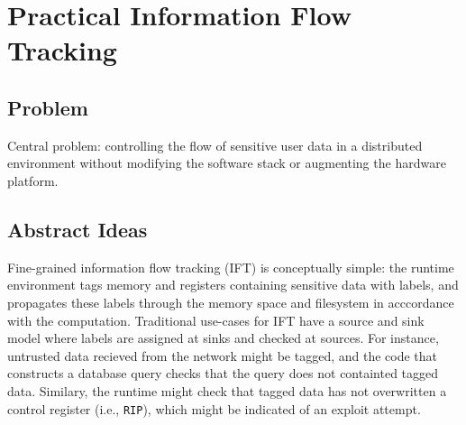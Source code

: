 \section{Practical Information Flow Tracking}

%
%
%
%
%
%
%
%
%
%
% 
%
%
%

\subsection{Problem}
Central problem: controlling the flow of sensitive user data in a distributed
environment without modifying the software stack or augmenting the hardware
platform.


\subsection{Abstract Ideas}

Fine-grained information flow tracking (IFT) is conceptually simple: the
runtime environment tags memory and registers containing sensitive data with
labels, and propagates these labels through the memory space and filesystem in
acccordance with the computation.
%
Traditional use-cases for IFT have a source and sink model where labels are
assigned at sinks and checked at sources.  For instance, untrusted data recieved from the
network might be tagged, and the code that constructs a database query checks
that the query does not containted tagged data.  Similary, the runtime might
check that tagged data has not overwritten a control register (i.e.,
\texttt{RIP}), which might be indicated of an exploit attempt.

